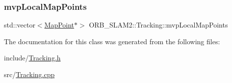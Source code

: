 \mbox{\label{class_o_r_b___s_l_a_m2_1_1_tracking_a89074acc520094ba0d0fc7f4c0f8cf09}} 
\subsubsection{\texorpdfstring{mvp\+Local\+Map\+Points}{mvpLocalMapPoints}}
{\footnotesize\ttfamily std\+::vector$<$\mbox{\hyperlink{class_o_r_b___s_l_a_m2_1_1_map_point}{Map\+Point}}$\ast$$>$ O\+R\+B\+\_\+\+S\+L\+A\+M2\+::\+Tracking\+::mvp\+Local\+Map\+Points\hspace{0.3cm}{\ttfamily [protected]}}



The documentation for this class was generated from the following files\+:\begin{DoxyCompactItemize}
\item 
include/\mbox{\hyperlink{_tracking_8h}{Tracking.\+h}}\item 
src/\mbox{\hyperlink{_tracking_8cpp}{Tracking.\+cpp}}\end{DoxyCompactItemize}
